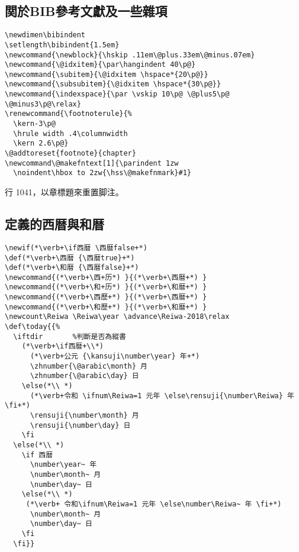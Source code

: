 \subsection{関於BIB參考文獻及一些雜項}

\begin{lstlisting}[firstnumber=1030]
\newdimen\bibindent
\setlength\bibindent{1.5em}
\newcommand{\newblock}{\hskip .11em\@plus.33em\@minus.07em}
\newcommand{\@idxitem}{\par\hangindent 40\p@}
\newcommand{\subitem}{\@idxitem \hspace*{20\p@}}
\newcommand{\subsubitem}{\@idxitem \hspace*{30\p@}}
\newcommand{\indexspace}{\par \vskip 10\p@ \@plus5\p@ \@minus3\p@\relax}
\renewcommand{\footnoterule}{%
  \kern-3\p@
  \hrule width .4\columnwidth
  \kern 2.6\p@}
\@addtoreset{footnote}{chapter}
\newcommand\@makefntext[1]{\parindent 1zw
  \noindent\hbox to 2zw{\hss\@makefnmark}#1}
\end{lstlisting}

\par 行 1041，以章標題來重置脚注。


\subsection{定義的西暦與和暦}

\begin{lstlisting}[firstnumber=1046]
\newif(*\verb+\if西暦 \西暦false+*)
\def(*\verb+\西暦 {\西暦true}+*)
\def(*\verb+\和暦 {\西暦false}+*)
\newcommand{(*\verb+\西+历*) }{(*\verb+\西暦+*) }
\newcommand{(*\verb+\和+历*) }{(*\verb+\和暦+*) }
\newcommand{(*\verb+\西歷+*) }{(*\verb+\西暦+*) }
\newcommand{(*\verb+\和歷+*) }{(*\verb+\和暦+*) }
\newcount\Reiwa \Reiwa\year \advance\Reiwa-2018\relax
\def\today{{%
  \iftdir		%判斷是否為縱書
    (*\verb+\if西暦+\\*)
      (*\verb+公元 {\kansuji\number\year} 年+*)
      \zhnumber{\@arabic\month} 月
      \zhnumber{\@arabic\day} 日
    \else(*\\ *)
      (*\verb+令和 \ifnum\Reiwa=1 元年 \else\rensuji{\number\Reiwa} 年 \fi+*)
      \rensuji{\number\month} 月
      \rensuji{\number\day} 日
    \fi
  \else(*\\ *)
    \if 西暦
      \number\year~ 年
      \number\month~ 月
      \number\day~ 日
    \else(*\\ *)
     (*\verb+ 令和\ifnum\Reiwa=1 元年 \else\number\Reiwa~ 年 \fi+*)
      \number\month~ 月
      \number\day~ 日
    \fi
  \fi}}
\end{lstlisting}

